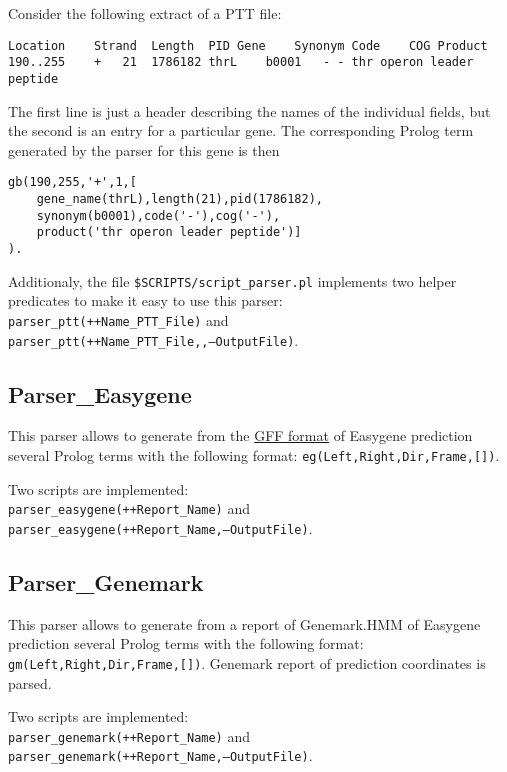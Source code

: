 \documentclass{book}
\begin{document}
\medskip
\noindent
Consider the following extract of a PTT file:
\begin{verbatim}
Location	Strand	Length	PID	Gene	Synonym	Code	COG	Product
190..255	+	21	1786182	thrL	b0001	- - thr operon leader peptide
\end{verbatim}

The first line is just a header describing the names of the
individual fields, but the second is an entry for a particular gene. 
The corresponding Prolog term generated by the parser for this gene is
then
\begin{verbatim}
gb(190,255,'+',1,[
    gene_name(thrL),length(21),pid(1786182),
    synonym(b0001),code('-'),cog('-'),
    product('thr operon leader peptide')]
).
\end{verbatim}

\noindent
Additionaly, the file \texttt{\$SCRIPTS/script\_parser.pl} implements two helper
predicates to make it easy to use this parser:\\ 
\texttt{parser\_ptt(++Name\_PTT\_File)} and \\
\texttt{parser\_ptt(++Name\_PTT\_File,,--OutputFile)}.

\subsection{Parser\_Easygene}

This parser allows to generate from the \href{http://servers.binf.ku.dk/easygene/1.2/gff_output.html}{GFF format} 
of Easygene prediction several Prolog terms with the following format:
\texttt{eg(Left,Right,Dir,Frame,[])}.

Two scripts are implemented:\\ 
\texttt{parser\_easygene(++Report\_Name)} and \\
\texttt{parser\_easygene(++Report\_Name,--OutputFile)}.

\subsection{Parser\_Genemark}

This parser allows to generate from a report of Genemark.HMM 
of Easygene prediction several Prolog terms with the following format:
\texttt{gm(Left,Right,Dir,Frame,[])}. 
Genemark report of prediction coordinates is parsed.

Two scripts are implemented:\\ 
\texttt{parser\_genemark(++Report\_Name)} and \\
\texttt{parser\_genemark(++Report\_Name,--OutputFile)}.
\end{document}
